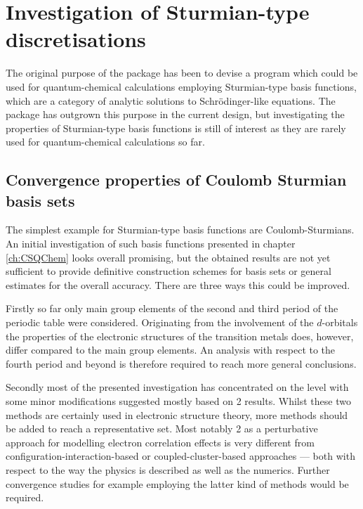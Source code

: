 \section{Investigation of Sturmian-type discretisations}
The original purpose of the \molsturm package has been to devise a program
which could be used for quantum-chemical calculations
employing Sturmian-type basis functions,
which are a category of analytic solutions to Schrödinger-like equations.
The package has outgrown this purpose in the current design,
but investigating the properties of Sturmian-type basis functions is still of interest
as they are rarely used for quantum-chemical calculations so far.

\subsection{Convergence properties of Coulomb Sturmian basis sets}
The simplest example for Sturmian-type basis functions are Coulomb-Sturmians.
An initial investigation of such basis functions presented
in chapter \ref{ch:CSQChem} looks overall promising,
but the obtained results are not yet sufficient to provide definitive
construction schemes for \CS basis sets
or general estimates for the overall accuracy.
There are three ways this could be improved.

Firstly so far only main group elements of the second and third
period of the periodic table were considered.
Originating from the involvement of the $d$-orbitals
the properties of the electronic structures of the transition metals does, however,
differ compared to the main group elements.
An analysis with respect to the fourth period and beyond
is therefore required to reach more general conclusions.

Secondly most of the presented investigation has concentrated on the \HF
level with some minor modifications suggested mostly based on {\MP}2 results.
Whilst these two methods are certainly used in electronic structure theory,
more methods should be added to reach a representative set.
Most notably {\MP}2 as a perturbative approach
for modelling electron correlation effects
is very different from
configuration-interaction-based
or coupled-cluster-based approaches
--- both with respect to the way the physics is described
as well as the numerics.
Further convergence studies for example employing the latter kind of methods
would be required.

